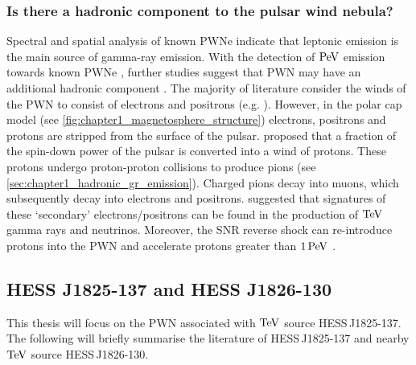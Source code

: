 \subsubsection{Is there a hadronic component to the pulsar wind nebula?}

Spectral and spatial analysis of known PWNe indicate that leptonic emission is the main source of gamma-ray emission. With the detection of $\PeV$ emission towards known PWNe \citep{doi:10.1126/science.abg5137}, further studies suggest that PWN may have an additional hadronic component \citep{10.1111/j.1745-3933.2010.00934.x, Xin_2019, 2021ApJ...922..221L}. The majority of literature consider the winds of the PWN to consist of electrons and positrons (e.g. \cite{2018A&A...612A...2H}). However, in the polar cap model (see \autoref{fig:chapter1_magnetosphere_structure}) electrons, positrons and protons are stripped from the surface of the pulsar. \cite{1994ApJ...435..230G} proposed that a fraction of the spin-down power of the pulsar is converted into a wind of protons. These protons undergo proton-proton collisions to produce pions (see \autoref{sec:chapter1_hadronic_gr_emission}). Charged pions decay into muons, which subsequently decay into electrons and positrons. \cite{2003A&A...402..827A} suggested that signatures of these `secondary' electrons/positrons can be found in the production of $\TeV$ gamma rays and neutrinos. Moreover, the SNR reverse shock can re-introduce protons into the PWN and accelerate protons greater than $1\,\PeV$ \citep{1992MNRAS.257..493B,2018MNRAS.478..926O}.


\subsection{HESS J1825-137 and HESS J1826-130} \label{sec:01_1825_1826}


This thesis will focus on the PWN associated with $\TeV$ source \mbox{HESS\,J1825-137}. The following will briefly summarise the literature of \mbox{HESS\,J1825-137} and nearby $\TeV$ source \mbox{HESS\,J1826-130}.

